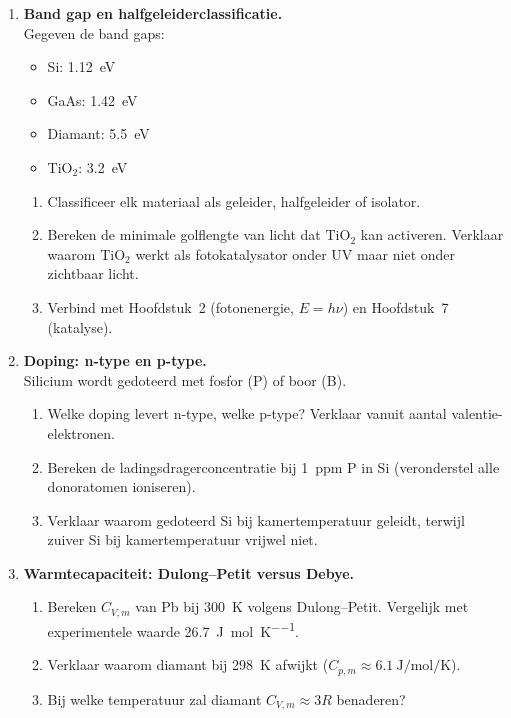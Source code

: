 \begin{enumerate}
\item \textbf{Band gap en halfgeleiderclassificatie.} \\
Gegeven de band gaps:
\begin{itemize}
\item Si: \SI{1.12}{\electronvolt}
\item GaAs: \SI{1.42}{\electronvolt}
\item Diamant: \SI{5.5}{\electronvolt}
\item $\mathrm{TiO_2}$: \SI{3.2}{\electronvolt}
\end{itemize}
\begin{enumerate}
\item[(a)] Classificeer elk materiaal als geleider, halfgeleider of isolator.
\item[(b)] Bereken de minimale golflengte van licht dat $\mathrm{TiO_2}$ kan activeren. Verklaar waarom $\mathrm{TiO_2}$ werkt als fotokatalysator onder UV maar niet onder zichtbaar licht.
\item[(c)] Verbind met Hoofdstuk~2 (fotonenergie, $E = h\nu$) en Hoofdstuk~7 (katalyse).
\end{enumerate}

\item \textbf{Doping: n-type en p-type.} \\
Silicium wordt gedoteerd met fosfor (P) of boor (B).
\begin{enumerate}
\item[(a)] Welke doping levert n-type, welke p-type? Verklaar vanuit aantal valentie-elektronen.
\item[(b)] Bereken de ladingsdragerconcentratie bij \SI{1}{ppm} P in Si (veronderstel alle donoratomen ioniseren).
\item[(c)] Verklaar waarom gedoteerd Si bij kamertemperatuur geleidt, terwijl zuiver Si bij kamertemperatuur vrijwel niet.
\end{enumerate}

\item \textbf{Warmtecapaciteit: Dulong--Petit versus Debye.} \\
\begin{enumerate}
\item[(a)] Bereken $C_{V,m}$ van Pb bij \SI{300}{\kelvin} volgens Dulong--Petit. Vergelijk met experimentele waarde \SI{26.7}{\joule\per\mole\per\kelvin}.
\item[(b)] Verklaar waarom diamant bij \SI{298}{\kelvin} afwijkt ($C_{p,m} \approx \SI{6.1}{\joule\per\mole\per\kelvin}$).
\item[(c)] Bij welke temperatuur zal diamant $C_{V,m} \approx 3R$ benaderen?
\end{enumerate}


\end{enumerate}
